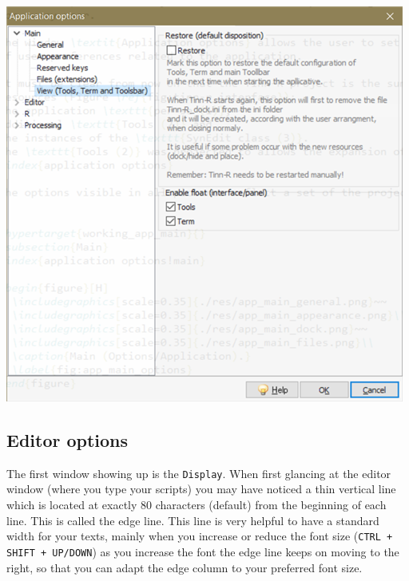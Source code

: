 \vspace{5mm}
\includegraphics[scale=0.8]{./res/app_main_view.png}
\vspace{5mm}


\subsection{Editor options}

The first window showing up is the \texttt{Display}. When first glancing at the editor window (where you type your scripts)
you may have noticed a thin vertical line which is located at exactly 80 characters (default) from the beginning of each line.
This is called the edge line. This line is very helpful to have a standard width for your texts,
mainly when you increase or reduce the font size (\texttt{CTRL + SHIFT + UP/DOWN})
as you increase the font the edge line keeps on moving to the right,
so that you can adapt the edge column to your preferred font size.

